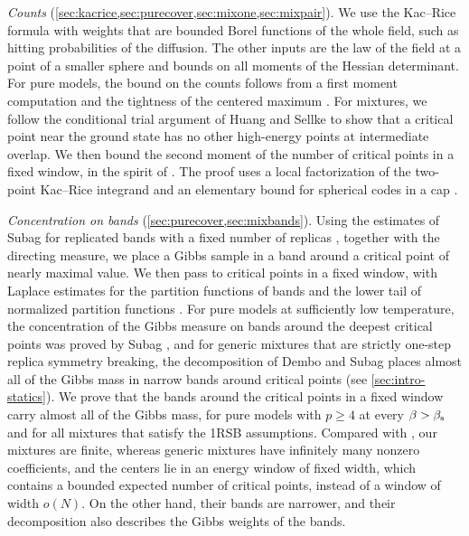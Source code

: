 \emph{Counts} (\cref{sec:kacrice,sec:purecover,sec:mixone,sec:mixpair}). We use the Kac--Rice formula \cite{AdlerTaylor2007,AzaisWschebor2009,Stecconi2022,MathisStecconi2024} with weights that are bounded Borel functions of the whole field, such as hitting probabilities of the diffusion. The other inputs are the law of the field at a point of a smaller sphere \cite{BenArousSubagZeitouni2020} and bounds on all moments of the Hessian determinant. For pure models, the bound on the counts follows from a first moment computation and the tightness of the centered maximum \cite{SubagZeitouni2017}. For mixtures, we follow the conditional trial argument of Huang and Sellke \cite[Section~3.3]{HuangSellke2024} to show that a critical point near the ground state has no other high-energy points at intermediate overlap. We then bound the second moment of the number of critical points in a fixed window, in the spirit of \cite{Subag2017complexity}. The proof uses a local factorization of the two-point Kac--Rice integrand and an elementary bound for spherical codes in a cap \cite{Rankin1955,BargMusin2007}.

\emph{Concentration on bands} (\cref{sec:purecover,sec:mixbands}). Using the estimates of Subag for replicated bands with a fixed number of replicas \cite[Lemmas~17--19 and Proposition~24]{Subag2024}, together with the directing measure, we place a Gibbs sample in a band around a critical point of nearly maximal value. We then pass to critical points in a fixed window, with Laplace estimates for the partition functions of bands and the lower tail of normalized partition functions \cite[Lemma~3.2 and Remark~3.3]{HuangMontanariPham2024}. For pure models at sufficiently low temperature, the concentration of the Gibbs measure on bands around the deepest critical points was proved by Subag \cite[Theorem~1]{Subag2017geometry}, and for generic mixtures that are strictly one-step replica symmetry breaking, the decomposition of Dembo and Subag places almost all of the Gibbs mass in narrow bands around critical points (see \cref{sec:intro-statics}). We prove that the bands around the critical points in a fixed window carry almost all of the Gibbs mass, for pure models with $p\ge4$ at every $\beta>\beta_{\mathrm s}$ and for all mixtures that satisfy the 1RSB assumptions. Compared with \cite[Proposition~3.1]{DemboSubag2026}, our mixtures are finite, whereas generic mixtures have infinitely many nonzero coefficients, and the centers lie in an energy window of fixed width, which contains a bounded expected number of critical points, instead of a window of width $o(N)$. On the other hand, their bands are narrower, and their decomposition also describes the Gibbs weights of the bands.

